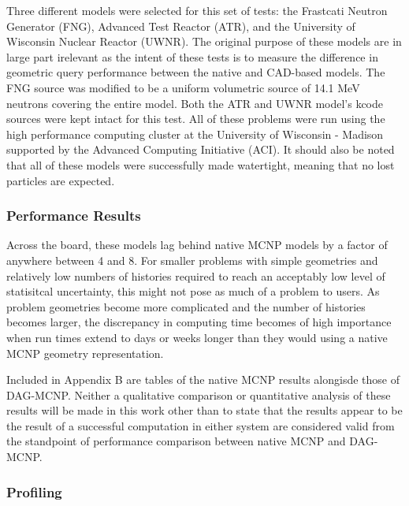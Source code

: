\documentclass[12pt, a4paper]{article}
\begin{document}
Three different models were selected for this set of tests: the Frastcati Neutron Generator (FNG), Advanced Test Reactor (ATR), and the University of Wisconsin Nuclear Reactor (UWNR). The original purpose of these models are in large part irelevant as the intent of these tests is to measure the difference in geometric query performance between the native and CAD-based models. The FNG source was modified to be a uniform volumetric source of 14.1 MeV neutrons covering the entire model. Both the ATR and UWNR model's kcode sources were kept intact for this test. All of these problems were run using the high performance computing cluster at the University of Wisconsin - Madison supported by the Advanced Computing Initiative (ACI). It should also be noted that all of these models were successfully made watertight, meaning that no lost particles are expected.

\subsubsection{Performance Results}%

Across the board, these models lag behind native MCNP models by a factor of anywhere between 4 and 8. For smaller problems with simple geometries and relatively low numbers of histories required to reach an acceptably low level of statisitcal uncertainty, this might not pose as much of a problem to users. As problem geometries become more complicated and the number of histories becomes larger, the discrepancy in computing time becomes of high importance when run times extend to days or weeks longer than they would using a native MCNP geometry representation.

Included in Appendix B are tables of the native MCNP results alongisde those of DAG-MCNP. Neither a qualitative comparison or quantitative analysis of these results will be made in this work other than to state that the results appear to be the result of a successful computation in either system are considered valid from the standpoint of performance comparison between native MCNP and DAG-MCNP.

\subsubsection{Profiling}%
\end{document}

